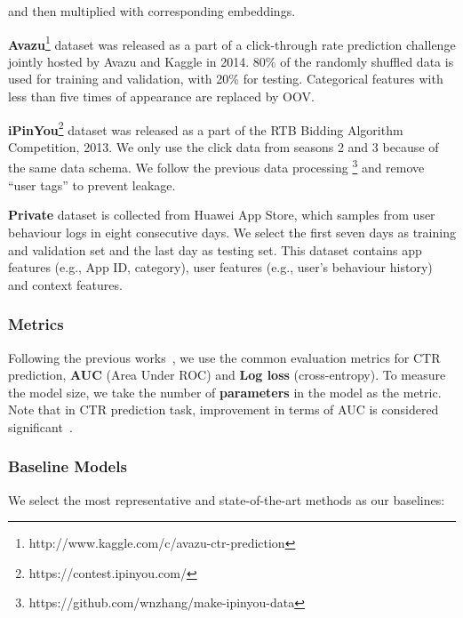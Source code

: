 \documentclass[conference]{IEEEtran}
\begin{document}
and then multiplied with corresponding embeddings. 

\textbf{Avazu}\footnote{http://www.kaggle.com/c/avazu-ctr-prediction} dataset was released as a part of a click-through rate prediction challenge jointly hosted by Avazu and Kaggle in 2014. 80\% of the randomly shuffled data is used for training and validation, with 20\% for testing. Categorical features with less than five times of appearance are replaced by OOV.

\textbf{iPinYou}\footnote{https://contest.ipinyou.com/} dataset was released as a part of the RTB Bidding Algorithm Competition, 2013. We only use the click data from seasons 2 and 3 because of the same data schema. We follow the previous data processing \cite{PNN19}\footnote{https://github.com/wnzhang/make-ipinyou-data} and remove “user tags” to prevent leakage.

\textbf{Private} dataset is collected from Huawei App Store, which samples from user behaviour logs in eight consecutive days. We select the first seven days as training and validation set and the last day as testing set. This dataset contains app features (e.g., App ID, category), user features (e.g., user's behaviour history) and context features. 

\subsubsection{Metrics}

Following the previous works~\cite{DeepFM,PNN16,PNN19}, we use the common evaluation metrics for CTR prediction, \textbf{AUC} (Area Under ROC) and \textbf{Log loss} (cross-entropy). To measure the model size, we take the number of \textbf{parameters} in the model as the metric. Note that in CTR prediction task,  improvement in terms of AUC is considered significant~\cite{Wide_Deep,FM2}.

\subsubsection{Baseline Models}

We select the most representative and state-of-the-art methods as our baselines: 
\end{document}
